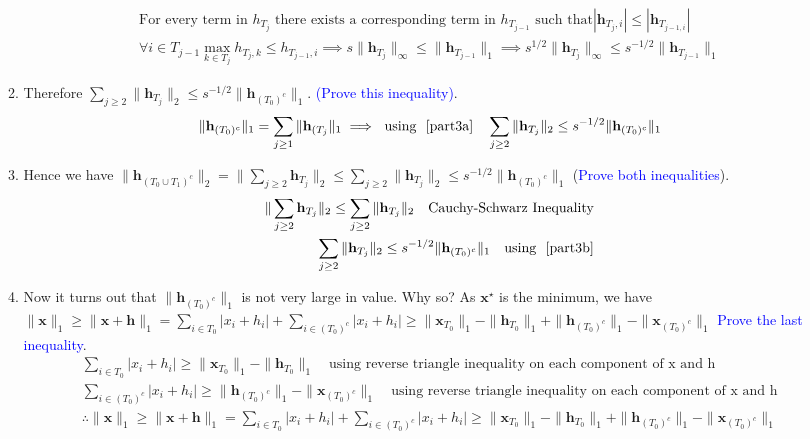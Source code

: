 \documentclass[11pt]{article}
\begin{document}
\begin{enumerate}
\begin{enumerate}
\begin{eqnarray}
\text{For every term in $h_{T_{j}}$ there exists a corresponding term in $h_{T_{j-1}}$ such that}
|\mathbf{h}_{T_j,i}| \leq |\mathbf{h}_{T_{j-1,i}}|\\
\forall i \in T_{j-1} \max_{k \in T_{j}} h_{T_{j},k} \leq h_{T_{j-1},i} \implies s \|\mathbf{h}_{T_j}\|_\infty \leq \|\mathbf{h}_{T_{j-1}}\|_1 \implies s^{1/2} \|\mathbf{h}_{T_j}\|_\infty \leq s^{-1/2}\|\mathbf{h}_{T_{j-1}}\|_1
\end{eqnarray}
\item Therefore $\sum_{j \geq 2}\|\mathbf{h}_{T_j}\|_2 \leq s^{-1/2} \|\mathbf{h}_{(T_0)^c}\|_1$. \textcolor{blue}{(Prove this inequality)}. 
\begin{eqnarray} \label{part3b}
\|\mathbf{h}_{(T_0)^c}\|_1 = \sum\limits_{j \geq 1} \|\mathbf{h}_{(T_{j}}\|_1
\implies \text{ using ~\ref{part3a}} \quad \sum_{j \geq 2}\|\mathbf{h}_{T_j}\|_2 \leq s^{-1/2} \|\mathbf{h}_{(T_0)^c}\|_1
\end{eqnarray}
\item Hence we have $\|\mathbf{h}_{(T_0 \cup T_1)^c}\|_2 = \|\sum_{j \geq 2} \mathbf{h}_{T_j}\|_2 \leq \sum_{j \geq 2} \|\mathbf{h}_{T_j}\|_2 \leq s^{-1/2} \|\mathbf{h}_{(T_0)^c}\|_1$ (\textcolor{blue}{Prove both inequalities}).
\begin{eqnarray}\label{part3c}
\|\sum_{j \geq 2} \mathbf{h}_{T_j}\|_2 \leq \sum_{j \geq 2} \|\mathbf{h}_{T_j}\|_2 \quad \text{Cauchy-Schwarz Inequality}\\
\sum_{j \geq 2} \|\mathbf{h}_{T_j}\|_2 \leq s^{-1/2} \|\mathbf{h}_{(T_0)^c}\|_1 \quad \text {using ~\ref{part3b}}
\end{eqnarray}
\item Now it turns out that $\|\mathbf{h}_{(T_0)^c}\|_1$ is not very large in value. Why so? As $\mathbf{x}^{\star}$ is the minimum, we have $\|\mathbf{x}\|_1 \geq \|\mathbf{x}+\mathbf{h}\|_1 = \sum_{i \in T_0} |x_i + h_i| + \sum_{i \in {(T_0)}^c} |x_i + h_i| \geq \|\mathbf{x}_{T_0}\|_1 - \|\mathbf{h}_{T_0}\|_1 + \|\mathbf{h}_{{(T_0)}^c}\|_1 - \|\mathbf{x}_{{(T_0)^c}}\|_1$ \textcolor{blue}{Prove the last inequality}. 
\begin{eqnarray}
\sum_{i \in T_0} |x_i + h_i| \geq  \|\mathbf{x}_{T_0}\|_1 - \|\mathbf{h}_{T_0}\|_1 \quad \text {using reverse triangle inequality on each component of x and h}\\
\sum_{i \in {(T_0)}^c} |x_i + h_i| \geq \|\mathbf{h}_{{(T_0)}^c}\|_1 - \|\mathbf{x}_{{(T_0)^c}}\|_1 \quad \text{using reverse triangle inequality on each component of x and h}\\
\therefore \|\mathbf{x}\|_1 \geq \|\mathbf{x}+\mathbf{h}\|_1 = \sum_{i \in T_0} |x_i + h_i| + \sum_{i \in {(T_0)}^c} |x_i + h_i| \geq \|\mathbf{x}_{T_0}\|_1 - \|\mathbf{h}_{T_0}\|_1 + \|\mathbf{h}_{{(T_0)}^c}\|_1 - \|\mathbf{x}_{{(T_0)^c}}\|_1

\end{eqnarray}
\end{enumerate}
\end{enumerate}
\end{document}
